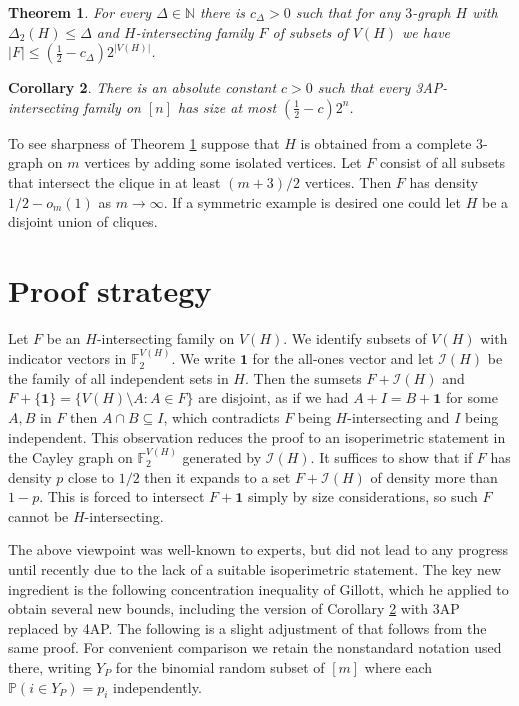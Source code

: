 \documentclass[11pt]{article}
\newtheorem{theorem}{Theorem}[section]
\newtheorem{corollary}[theorem]{Corollary}
\newcommand{\I}{\mathcal I}
\newcommand{\Prob}{\mathbb P}
\newcommand{\1}{\mathbf 1}
\begin{document}
\begin{theorem}\label{thm:main}
For every $\Delta \in \mathbb{N}$ there is $c_\Delta>0$
such that for any $3$-graph $H$ with $\Delta_2(H)\le\Delta$
and $H$-intersecting family $F$ of subsets of $V(H)$
we have $|F| \le (\tfrac12 - c_\Delta)2^{|V(H)|}$.
\end{theorem}

\begin{corollary}\label{cor:3ap}
There is an absolute constant \(c>0\) such that every
3AP-intersecting family on $[n]$ has size at most $(\tfrac12 - c)2^n$. 
\end{corollary}

To see sharpness of Theorem \ref{thm:main} suppose that $H$ is obtained from a complete $3$-graph on $m$ vertices by adding some isolated vertices.
Let $F$ consist of all subsets that intersect the clique in at least $(m+3)/2$ vertices.
Then $F$ has density $1/2 - o_m(1)$ as $m \to \infty$. If a symmetric example is desired
one could let $H$ be a disjoint union of cliques.

\section{Proof strategy}

Let $F$ be an $H$-intersecting family on $V(H)$.
We identify subsets of $V(H)$ with indicator vectors in $\mathbb{F}_2^{V(H)}$.
We write \(\1\) for the all-ones vector and
let $\I(H)$ be the family of all independent sets in $H$.
Then the sumsets $F+\I(H)$ and $F+\{\1\} = \{ V(H) \setminus A: A \in F\}$ are disjoint,
as if we had $A+I=B+\1$ for some $A,B$ in $F$ then $A \cap B \subseteq I$,
which contradicts $F$ being $H$-intersecting and $I$ being independent.
This observation reduces the proof to an isoperimetric statement 
in the Cayley graph on $\mathbb{F}_2^{V(H)}$ generated by $\I(H)$.
It suffices to show that if $F$ has density $p$ close to $1/2$ then it expands
to a set $F+\I(H)$ of density more than $1-p$. This is forced to intersect $F+\1$
simply by size considerations, so such $F$ cannot be $H$-intersecting.

The above viewpoint was well-known to experts, but did not lead to any progress
until recently due to the lack of a suitable isoperimetric statement. The key new
ingredient is the following concentration inequality of Gillott, which he applied to
obtain several new bounds, including the version of Corollary \ref{cor:3ap}
with 3AP replaced by 4AP. The following is a slight adjustment of
\cite[Theorem~3.1]{Gillott2026} that follows from the same proof.
For convenient comparison we retain the nonstandard notation used there,
writing $Y_P$ for the binomial random subset of $[m]$ where
each $\Prob(i \in Y_P)=p_i$ independently.
\end{document}
